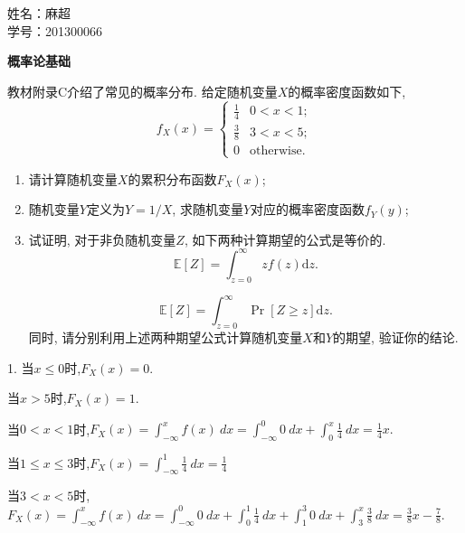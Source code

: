 \documentclass[answers]{exam}  %
\begin{document}
\Large
\noindent
姓名：麻超 \\
学号：201300066 \\
\begin{questions}
    \question [30] \textbf{概率论基础}

    教材附录C介绍了常见的概率分布.
    给定随机变量$X$的概率密度函数如下,
    \begin{equation}
        f_X(x) =
        \begin{cases}
            \frac{1}{4} & 0<x<1;            \\
            \frac{3}{8} & 3<x<5;            \\
            0           & \mbox{otherwise.}
        \end{cases}
    \end{equation}

    \begin{enumerate}
        \item  请计算随机变量$X$的累积分布函数$F_X(x)$;
        \item  随机变量$Y$定义为$Y = 1/X$, 求随机变量$Y$对应的概率密度函数$f_Y(y)$;
        \item  试证明, 对于非负随机变量$Z$, 如下两种计算期望的公式是等价的.
              \begin{equation}
                  \label{ch1-eq-expect-1}
                  \mathbb{E}[Z] = \int_{z=0}^{\infty}zf(z) \mathrm{d} z.
              \end{equation}

              \begin{equation}
                  \label{ch1-eq-expect-2}
                  \mathbb{E}[Z] = \int_{z=0}^{\infty}\Pr[Z\geq z] \mathrm{d} z.
              \end{equation}
              同时, 请分别利用上述两种期望公式计算随机变量$X$和$Y$的期望, 验证你的结论.
    \end{enumerate}
    \begin{solution}
        1.
        当$x\leq 0$时,$F_X(x)=0.$

        当$x>5$时,$F_X(x)=1.$

        当$0<x<1$时,$F_X(x)=\int_{-\infty}^x f(x)\ dx=\int_{-\infty}^0 0\ dx+\int_{0}^x \frac{1}{4} \ dx=\frac{1}{4} x.$

        当$1\leq x\leq 3$时,$F_X(x)=\int_{-\infty}^1 \frac{1}{4} \ dx=\frac{1}{4} $

        当$3<x<5$时,$F_X(x)=\int_{-\infty}^x f(x)\ dx=\int_{-\infty}^0 0\ dx+\int_{0}^1 \frac{1}{4} \ dx+\int_{1}^3 0\ dx+\int_{3}^x \frac{3}{8} \ dx= \frac{3}{8} x-\frac{7}{8} .$


\end{solution}
\end{questions}
\end{document}
